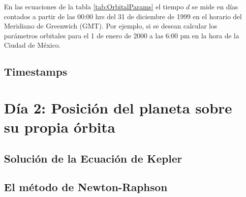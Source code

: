 \documentclass[a4paper,10pt]{article}
\begin{document}
En las ecuaciones de la tabla \ref{tab:OrbitalParams} el tiempo $d$ se mide en días contados a partir de las 00:00 hrs del 31 de diciembre de 1999 en el horario del Meridiano de Greenwich (GMT). Por ejemplo, si se desean calcular los parámetros orbitales para el 1 de enero de 2000 a las 6:00 pm en la hora de la Ciudad de México. 

\subsection{Timestamps}

\section{Día 2: Posición del planeta sobre su propia órbita}

\subsection{Solución de la Ecuación de Kepler}

\subsection{El método de Newton-Raphson}
\end{document}
